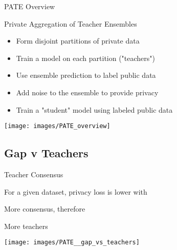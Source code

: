 \documentclass[xor=table]{beamer}
\let\svpar\par
\let\svitemize\itemize
\let\svenditemize\enditemize
\let\svitem\item
\let\svcenter\center
\let\svendcenter\endcenter
\let\svcolumn\column
\let\svendcolumn\endcolumn
\newcommand\stretchoff{%
  \let\par\svpar%
  \let\item\svitem%
  \let\itemize\svitemize%
  \let\enditemize\svenditemize%
  \let\center\svcenter%
  \let\endcenter\svendcenter%
  \let\column\svcolumn%
  \let\endcolumn\svendcolumn%
}
\begin{document}
\begin{frame}{PATE Overview}

Private Aggregation of Teacher Ensembles

	\begin{itemize}
	\item Form disjoint partitions of private data
	\item Train a model on each partition ("teachers")
	\item Use ensemble prediction to label public data
	\item Add noise to the ensemble to provide privacy
	\item Train a "student" model using labeled public data

	\end{itemize}

	\begin{center}
	\texttt{[image: images/PATE\_overview]}
	\end{center}




\end{frame}





\subsection*{Gap v Teachers}
\stretchoff
\begin{frame}{Teacher Consensus}

 \begin{multicols}{2}
For a given dataset, privacy loss is lower with
	\begin{itemize}
	\item More consensus, therefore
	\item More teachers

	\end{itemize}
\columnbreak
	\begin{center}
	\texttt{[image: images/PATE\_\_gap\_vs\_teachers]}
	\end{center}

\end{multicols}
\end{frame}
\end{document}
